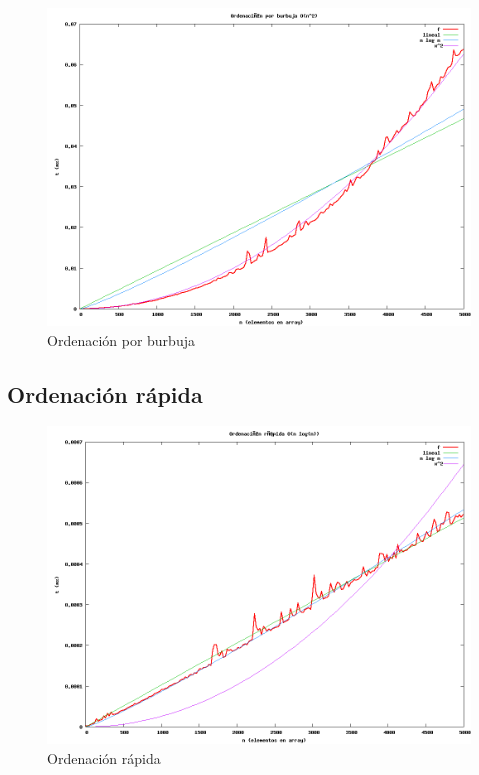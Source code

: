 	\begin{figure}[H]
	  \centering
	    \includegraphics[width=1.0\textwidth]{bubble-sort.png}
	  \caption{Ordenación por burbuja}
	  \label{fig:bubble}
	\end{figure}

\subsection{Ordenación r\'apida}

	\begin{figure}[H]
  		\centering
   	 	\includegraphics[width=1.0\textwidth]{quick-sort.png}
  		\caption{Ordenación rápida}
  		\label{fig:quick}
	\end{figure}
